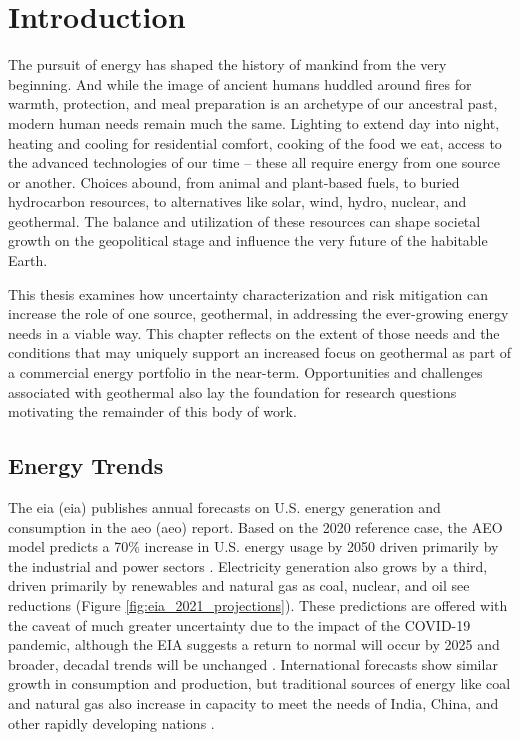 \chapter{Introduction}\label{ch1:intro}
The pursuit of energy has shaped the history of mankind from the very beginning. And while the image of ancient humans huddled around fires for warmth, protection, and meal preparation is an archetype of our ancestral past, modern human needs remain much the same. Lighting to extend day into night, heating and cooling for residential comfort, cooking of the food we eat, access to the advanced technologies of our time – these all require energy from one source or another. Choices abound, from animal and plant-based fuels, to buried hydrocarbon resources, to alternatives like solar, wind, hydro, nuclear, and geothermal. The balance and utilization of these resources can shape societal growth on the geopolitical stage and influence the very future of the habitable Earth.

This thesis examines how uncertainty characterization and risk mitigation can increase the role of one source, geothermal, in addressing the ever-growing energy needs in a viable way. This chapter reflects on the extent of those needs and the conditions that may uniquely support an increased focus on geothermal as part of a commercial energy portfolio in the near-term. Opportunities and challenges associated with geothermal also lay the foundation for research questions motivating the remainder of this body of work.

\section{Energy Trends}\label{ch1:trends}
The \acrlong{eia} (\acrshort{eia}) publishes annual forecasts on U.S. energy generation and consumption in the \acrlong{aeo} (\acrshort{aeo}) report. Based on the 2020 reference case, the AEO model predicts a 70\% increase in U.S. energy usage by 2050 driven primarily by the industrial and power sectors \citep{us_energy_information_administration_annual_2021}. Electricity generation also grows by a third, driven primarily by renewables and natural gas as coal, nuclear, and oil see reductions (Figure \ref{fig:eia_2021_projections}). These predictions are offered with the caveat of much greater uncertainty due to the impact of the COVID-19 pandemic, although the EIA suggests a return to normal will occur by 2025 and broader, decadal trends will be unchanged \citep{us_energy_information_administration_annual_2021}. International forecasts show similar growth in consumption and production, but traditional sources of energy like coal and natural gas also increase in capacity to meet the needs of India, China, and other rapidly developing nations \citep{us_energy_information_administration_international_2020}. 
 

